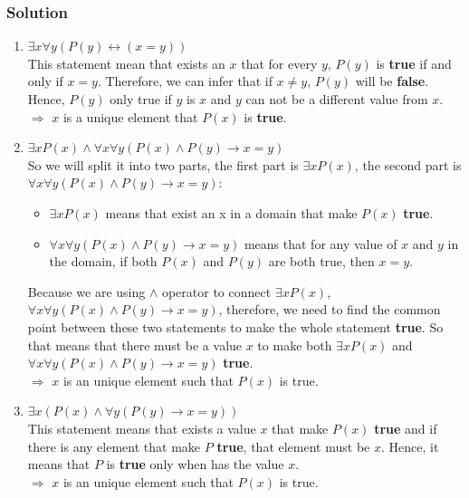\documentclass{article}
\begin{document}
\subsubsection*{Solution}
\begin{enumerate} [label = (\alph*)]
    \item $\exists x \forall y(P(y) \leftrightarrow (x = y))$ \\
          This statement mean that exists an $x$ that for every $y$, $P(y)$ is \textbf{true} if and only if $x = y$. Therefore, we can infer that if $x \ne y$, $P(y)$ will be \textbf{false}. Hence, $P(y)$ only true if $y$ is $x$ and $y$ can not be a different value from $x$.\\
          $\Rightarrow$ $x$ is a unique element that $P(x)$ is \textbf{true}.
    \item $\exists xP(x) \land \forall x \forall y(P(x) \land P(y) \to x = y)$\\
          So we will split it into two parts, the first part is $\exists xP(x)$, the second part is $\forall x\forall y(P(x)\land P(y) \to x =y)$:
          \begin{itemize}
              \item $\exists xP(x)$ means that exist an x in a domain that make $P(x)$ \textbf{true}.
              \item $\forall x\forall y(P(x)\land P(y) \to x =y)$ means that for any value of $x$ and $y$ in the domain, if both $P(x)$ and $P(y)$ are both true, then $x = y$.
          \end{itemize}
          Because we are using $\land$ operator to connect $\exists xP(x)$, $\forall x\forall y(P(x)\land P(y) \to x =y)$, therefore, we need to find the common point between these two statements to make the whole statement \textbf{true}. So that means that there must be a value $x$ to make both $\exists xP(x)$ and $\forall x\forall y(P(x)\land P(y) \to x =y)$ \textbf{true}. \\
          $\Rightarrow$ $x$ is an unique element such that $P(x)$ is true.
    \item $\exists x(P(x) \land \forall y(P(y) \to x = y))$\\
          This statement means that exists a value $x$ that make $P(x)$ \textbf{true} and if there is any element that make $P$ \textbf{true}, that element must be $x$. Hence, it means that $P$ is \textbf{true} only when has the value $x$.\\
          $\Rightarrow$ $x$ is an unique element such that $P(x)$ is true.
\end{enumerate}
\end{document}
